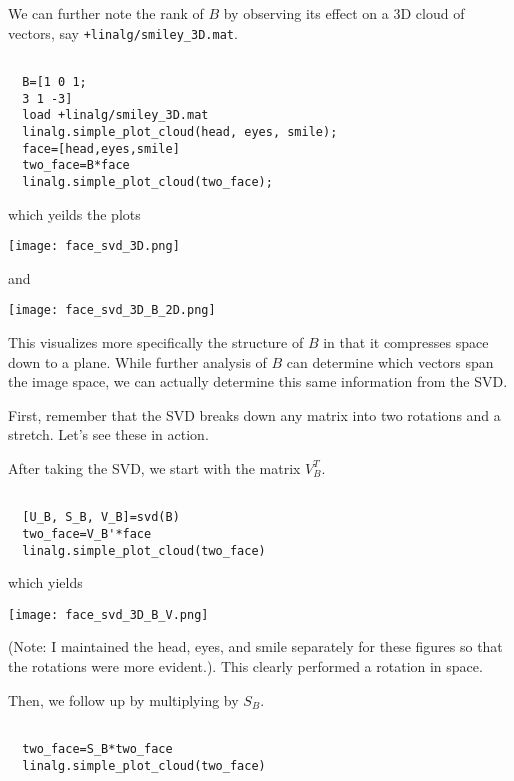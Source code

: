 \documentclass{ximera}
\begin{document}
We can further note the rank of $B$ by observing its effect on a $3$D cloud of vectors, say \texttt{+linalg/smiley\_3D.mat}. 

\begin{verbatim}

  B=[1 0 1;
  3 1 -3]
  load +linalg/smiley_3D.mat
  linalg.simple_plot_cloud(head, eyes, smile);
  face=[head,eyes,smile]
  two_face=B*face
  linalg.simple_plot_cloud(two_face);
\end{verbatim}

which yeilds the plots 

\begin{center}
  \texttt{[image: face\_svd\_3D.png]}
\end{center}

    and 

\begin{center}
  \texttt{[image: face\_svd\_3D\_B\_2D.png]}
\end{center}

This visualizes more specifically the structure of $B$ in that it compresses space down to a plane. While further analysis of $B$ can determine which vectors span the image space, we can actually determine this same information from the SVD. 

First, remember that the SVD breaks down any matrix into two rotations and a stretch. Let's see these in action.

After taking the SVD, we start with the matrix $V_B^T$.

\begin{verbatim}

  [U_B, S_B, V_B]=svd(B)
  two_face=V_B'*face
  linalg.simple_plot_cloud(two_face)

\end{verbatim}

which yields

\begin{center}
  \texttt{[image: face\_svd\_3D\_B\_V.png]}
\end{center}

(Note: I maintained the head, eyes, and smile separately for these figures so that the rotations were more evident.). This clearly performed a rotation in space.

Then, we follow up by multiplying by $S_B$.

\begin{verbatim}

  two_face=S_B*two_face
  linalg.simple_plot_cloud(two_face)

\end{verbatim}
\end{document}
